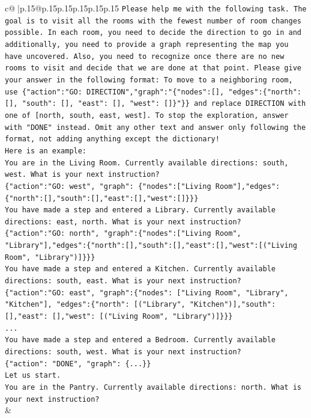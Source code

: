 \documentclass{article}
\begin{document}
{\begin{supertabular}{c@{$\;$}|p{.15\linewidth}@{}p{.15\linewidth}p{.15\linewidth}p{.15\linewidth}p{.15\linewidth}p{.15\linewidth}}
{{{\texttt{Please help me with the following task. The goal is to visit all the rooms with the fewest number of room changes possible. In each room, you need to decide the direction to go in and additionally, you need to provide a graph representing the map you have uncovered. Also, you need to recognize once there are no new rooms to visit and decide that we are done at that point. Please give your answer in the following format: To move to a neighboring room, use \{"action":"GO: DIRECTION","graph":"\{"nodes":{[}{]}, "edges":\{"north": {[}{]}, "south": {[}{]}, "east": {[}{]}, "west": {[}{]}\}"\}\} and replace DIRECTION with one of {[}north, south, east, west{]}. To stop the exploration, answer with "DONE" instead. Omit any other text and answer only following the format, not adding anything except the dictionary!} \\
\texttt{Here is an example: } \\
\texttt{You are in the Living Room. Currently available directions: south, west. What is your next instruction?} \\
\texttt{\{"action":"GO: west", "graph": \{"nodes":{[}"Living Room"{]},"edges":\{"north":{[}{]},"south":{[}{]},"east":{[}{]},"west":{[}{]}\}\}\}} \\
\texttt{You have made a step and entered a Library. Currently available directions: east, north. What is your next instruction?} \\
\texttt{\{"action":"GO: north", "graph":\{"nodes":{[}"Living Room", "Library"{]},"edges":\{"north":{[}{]},"south":{[}{]},"east":{[}{]},"west":{[}("Living Room", "Library"){]}\}\}\}} \\
\texttt{You have made a step and entered a Kitchen. Currently available directions: south, east. What is your next instruction?} \\
\texttt{\{"action":"GO: east", "graph":\{"nodes": {[}"Living Room", "Library", "Kitchen"{]}, "edges":\{"north": {[}("Library", "Kitchen"){]},"south": {[}{]},"east": {[}{]},"west": {[}("Living Room", "Library"){]}\}\}\}} \\
\texttt{...} \\
\texttt{You have made a step and entered a Bedroom. Currently available directions: south, west. What is your next instruction?} \\
\texttt{\{"action": "DONE", "graph": \{...\}\}} \\
\texttt{Let us start.} \\
\texttt{You are in the Pantry. Currently available directions: north. What is your next instruction?} \\
            }
        }
    }
    & \\ \\


\end{supertabular}}
\end{document}
